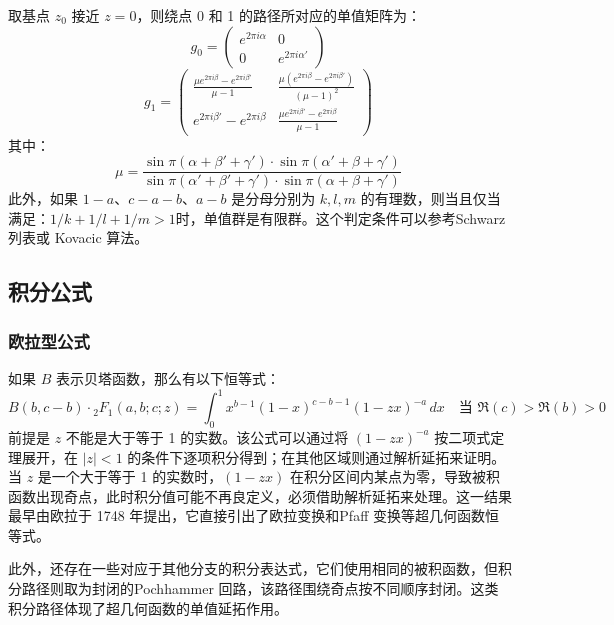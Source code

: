 取基点 $z_0$ 接近 $z = 0$，则绕点 0 和 1 的路径所对应的单值矩阵为：
$$
g_0 =
\begin{pmatrix}
e^{2\pi i \alpha} & 0 \\
0 & e^{2\pi i \alpha'}
\end{pmatrix}~
$$
$$
g_1 =
\begin{pmatrix}
\frac{\mu e^{2\pi i \beta} - e^{2\pi i \beta'}}{\mu - 1}
&
\frac{\mu (e^{2\pi i \beta} - e^{2\pi i \beta'})}{(\mu - 1)^2}
\\[6pt]
e^{2\pi i \beta'} - e^{2\pi i \beta}
&
\frac{\mu e^{2\pi i \beta'} - e^{2\pi i \beta}}{\mu - 1}
\end{pmatrix}~
$$
其中：
$$
\mu = \frac{
\sin \pi(\alpha + \beta' + \gamma') \cdot \sin \pi(\alpha' + \beta + \gamma')
}{
\sin \pi(\alpha' + \beta' + \gamma') \cdot \sin \pi(\alpha + \beta + \gamma')
}~
$$
此外，如果 $1 - a$、$c - a - b$、$a - b$ 是分母分别为 $k, l, m$ 的有理数，则当且仅当满足：$1/k + 1/l + 1/m> 1$时，单值群是有限群。这个判定条件可以参考Schwarz 列表或 Kovacic 算法。
\subsection{积分公式}
\subsubsection{欧拉型公式}
如果 $B$ 表示贝塔函数，那么有以下恒等式：
$$
B(b, c - b) \cdot {}_2F_1(a, b; c; z) = \int_0^1 x^{b - 1}(1 - x)^{c - b - 1}(1 - zx)^{-a} \, dx \quad \text{当 } \Re(c) > \Re(b) > 0~
$$
前提是 $z$ 不能是大于等于 1 的实数。该公式可以通过将 $(1 - zx)^{-a}$ 按二项式定理展开，在 $|z| < 1$ 的条件下逐项积分得到；在其他区域则通过解析延拓来证明。当 $z$ 是一个大于等于 1 的实数时，$(1 - zx)$ 在积分区间内某点为零，导致被积函数出现奇点，此时积分值可能不再良定义，必须借助解析延拓来处理。这一结果最早由欧拉于 1748 年提出，它直接引出了欧拉变换和Pfaff 变换等超几何函数恒等式。

此外，还存在一些对应于其他分支的积分表达式，它们使用相同的被积函数，但积分路径则取为封闭的Pochhammer 回路，该路径围绕奇点按不同顺序封闭。这类积分路径体现了超几何函数的单值延拓作用。


